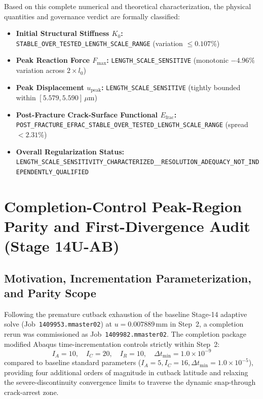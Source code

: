 Based on this complete numerical and theoretical characterization, the physical quantities and governance verdict are formally classified:
\begin{itemize}
  \item \textbf{Initial Structural Stiffness $K_0$:} \texttt{STABLE\_OVER\_TESTED\_LENGTH\_SCALE\_RANGE} (variation $\le 0.107\%$)
  \item \textbf{Peak Reaction Force $F_{\max}$:} \texttt{LENGTH\_SCALE\_SENSITIVE} (monotonic $-4.96\%$ variation across $2\times l_0$)
  \item \textbf{Peak Displacement $u_{\text{peak}}$:} \texttt{LENGTH\_SCALE\_SENSITIVE} (tightly bounded within $[5.579, 5.590]\,\mu\mathrm{m}$)
  \item \textbf{Post-Fracture Crack-Surface Functional $E_{\mathrm{frac}}$:} \texttt{POST\_FRACTURE\_EFRAC\_STABLE\_OVER\_TESTED\_LENGTH\_SCALE\_RANGE} (spread $< 2.31\%$)
  \item \textbf{Overall Regularization Status:} \texttt{LENGTH\_SCALE\_SENSITIVITY\_CHARACTERIZED\_\_RESOLUTION\_ADEQUACY\_NOT\_INDEPENDENTLY\_QUALIFIED}
\end{itemize}

\section{Completion-Control Peak-Region Parity and First-Divergence Audit (Stage 14U-AB)}
\label{sec:stage14uab_parity_audit}

\subsection{Motivation, Incrementation Parameterization, and Parity Scope}
\label{subsec:stage14uab_motivation}

Following the premature cutback exhaustion of the baseline Stage-14 adaptive solve (Job~\texttt{1409953.mmaster02}) at $u = 0.007889\,\mathrm{mm}$ in Step~2, a completion rerun was commissioned as Job~\texttt{1409982.mmaster02}. The completion package modified Abaqus time-incrementation controls strictly within Step~2:
\begin{equation}
  I_A = 10, \quad I_C = 20, \quad I_R = 10, \quad \Delta t_{\min} = 1.0 \times 10^{-9}
\end{equation}
compared to baseline standard parameters ($I_A=5, I_C=16, \Delta t_{\min}=1.0 \times 10^{-5}$), providing four additional orders of magnitude in cutback latitude and relaxing the severe-discontinuity convergence limits to traverse the dynamic snap-through crack-arrest zone.

